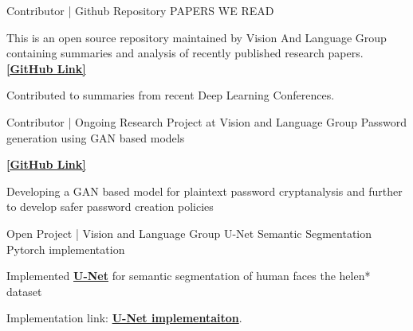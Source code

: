 
\begin{cventries}

  \cventry
    {Contributor | Github Repository} %
    {PAPERS WE READ} %
    {} %
    {} %
    {
      \begin{cvitems} %
        \item {This is an open source repository maintained by Vision And Language Group containing summaries and analysis of recently published research papers. {\href{https://github.com/vlgiitr/papers_we_read}{\bf [GitHub Link]}}}
        \item {Contributed to summaries from recent Deep Learning Conferences.}
      \end{cvitems}
    }
    
\cventry
    {Contributor | Ongoing Research Project at Vision and Language Group} %
    {Password generation using GAN based models} %
    {} %
    {} %
    {
      \begin{cvitems} %
        \item { {\href{https://github.com/vlgiitr/PassFormer}{\bf [GitHub Link]}}}
        \item {Developing a GAN based model for plaintext password cryptanalysis and further to develop safer password creation policies} 
      \end{cvitems}
    }
\cventry
    {Open Project | Vision and Language Group} %
    {U-Net Semantic Segmentation Pytorch implementation} %
    {} %
    {} %
    {
      \begin{cvitems} %
        \item {Implemented \href{https://arxiv.org/pdf/1505.04597.pdf}{\bf U-Net} for semantic segmentation of human faces the helen* dataset}
        \item {Implementation link: {\href{https://github.com/kumar-devesh/unet}{\bf U-Net implementaiton}}.}
      \end{cvitems}
    }
    

\end{cventries}
